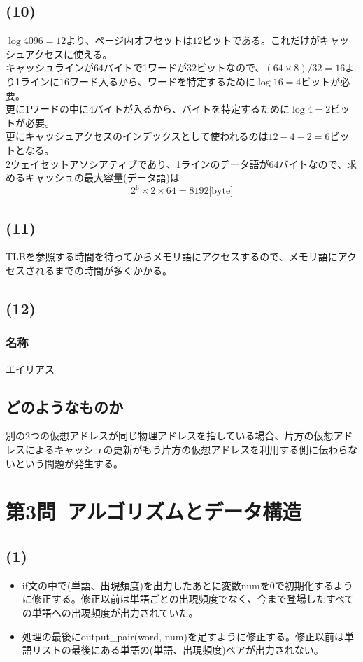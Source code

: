 \documentclass[a4paper,12pt,xelatex,ja=standard]{bxjsarticle}
\begin{document}
\subsection*{(10)}
$\log 4096 = 12$より、ページ内オフセットは$12$ビットである。これだけがキャッシュアクセスに使える。\\
キャッシュラインが$64$バイトで1ワードが$32$ビットなので、$(64 \times 8) / 32 = 16$より1ラインに$16$ワード入るから、ワードを特定するために$\log 16 = 4$ビットが必要。\\
更に1ワードの中に$4$バイトが入るから、バイトを特定するために$\log 4 = 2$ビットが必要。\\
更にキャッシュアクセスのインデックスとして使われるのは$12 - 4 - 2 = 6$ビットとなる。\\
2ウェイセットアソシアティブであり、1ラインのデータ語が64バイトなので、求めるキャッシュの最大容量(データ語)は
\[
  2^6 \times 2 \times 64 = 8192 \text{[byte]}
\]

\subsection*{(11)}
TLBを参照する時間を待ってからメモリ語にアクセスするので、メモリ語にアクセスされるまでの時間が多くかかる。

\subsection*{(12)}
\subsubsection*{名称}
エイリアス
\subsection*{どのようなものか}
別の2つの仮想アドレスが同じ物理アドレスを指している場合、片方の仮想アドレスによるキャッシュの更新がもう片方の仮想アドレスを利用する側に伝わらないという問題が発生する。

\section*{第3問\ アルゴリズムとデータ構造}
\subsection*{(1)}
\begin{itemize}
  \item if文の中で(単語、出現頻度)を出力したあとに変数numを0で初期化するように修正する。修正以前は単語ごとの出現頻度でなく、今まで登場したすべての単語への出現頻度が出力されていた。
  \item 処理の最後にoutput\_pair(word, num)を足すように修正する。修正以前は単語リストの最後にある単語の(単語、出現頻度)ペアが出力されない。
\end{itemize}
\end{document}
